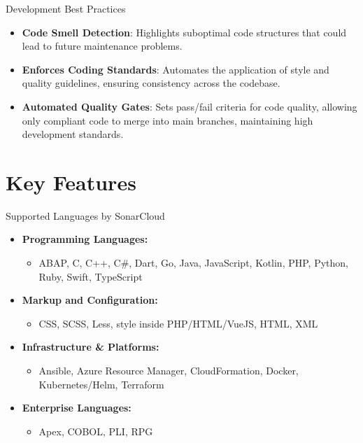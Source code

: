 \documentclass{beamer}
\begin{document}
\begin{frame}{Development Best Practices}
  \begin{itemize}
    \item \textbf{Code Smell Detection}: Highlights suboptimal code structures that could lead to future maintenance problems.
    \vspace*{0.75em}
    \item \textbf{Enforces Coding Standards}: Automates the application of style and quality guidelines, ensuring consistency across the codebase.
    \vspace*{0.75em}
    \item \textbf{Automated Quality Gates}: Sets pass/fail criteria for code quality, allowing only compliant code to merge into main branches, maintaining high development standards.
  \end{itemize}
\end{frame}


\section[Key Features]{Key Features}

\begin{frame}{Supported Languages by SonarCloud}
  \begin{itemize}
      \item \textbf{Programming Languages:}
      \begin{itemize}
          \item ABAP, C, C++, C\#, Dart, Go, Java, JavaScript, Kotlin, PHP, Python, Ruby, Swift, TypeScript
      \end{itemize}
      \vspace*{0.5em}
        \item \textbf{Markup and Configuration:}
      \begin{itemize}
        \item CSS, SCSS, Less, style inside PHP/HTML/VueJS, HTML, XML
      \end{itemize}
      \vspace*{0.5em}
      \item \textbf{Infrastructure \& Platforms:}
      \begin{itemize}
        \item Ansible, Azure Resource Manager, CloudFormation, Docker, Kubernetes/Helm, Terraform
      \end{itemize}
      \vspace*{0.5em}
      \item \textbf{Enterprise Languages:}
      \begin{itemize}
        \item Apex, COBOL, PLI, RPG
      \end{itemize}
  \end{itemize}
\end{frame}
\end{document}
